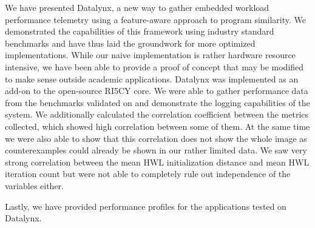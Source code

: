 \documentclass[../bachelor_paper.tex]{subfiles}
\begin{document}
We have presented Datalynx, a new way to gather embedded workload performance telemetry using a feature-aware approach to program similarity. We demonstrated the capabilities of this framework using industry standard benchmarks and have thus laid the groundwork for more optimized implementations. While our naive implementation is rather hardware resource intensive, we have been able to provide a proof of concept that may be modified to make sense outside academic applications. Datalynx was implemented as an add-on to the open-source RI5CY core. We were able to gather performance data from the benchmarks validated on and demonstrate the logging capabilities of the system. We additionally calculated the correlation coefficient between the metrics collected, which showed high correlation between some of them. At the same time we were also able to show that this correlation does not show the whole image as counterexamples could already be shown in our rather limited data. We saw very strong correlation between the mean \ac{HWL} initialization distance and mean \ac{HWL} iteration count but were not able to completely rule out independence of the variables either.

Lastly, we have provided performance profiles for the applications tested on Datalynx.

\isstandalone



\fi
\end{document}

